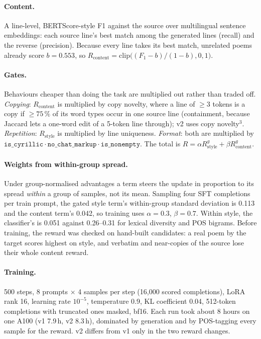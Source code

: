 \documentclass[11pt]{article}
\begin{document}
\paragraph{Content.} A line-level, BERTScore-style F1 against the source over
multilingual sentence embeddings: each source line's best match among the
generated lines (recall) and the reverse (precision). Because every line takes
its best match, unrelated poems already score $b=0.553$, so
$R_{\mathrm{content}}=\mathrm{clip}\big((F_1-b)/(1-b),0,1\big)$.

\paragraph{Gates.} Behaviours cheaper than doing the task are multiplied out
rather than traded off. \emph{Copying}: $R_{\mathrm{content}}$ is multiplied
by copy novelty, where a line of $\ge3$ tokens is a copy if $\ge75\,\%$ of its
word types occur in one source line (containment, because Jaccard lets a
one-word edit of a 5-token line through); v2 uses copy novelty$^3$.
\emph{Repetition}: $R_{\mathrm{style}}$ is multiplied by line uniqueness.
\emph{Format}: both are multiplied by
$\texttt{is\_cyrillic}\cdot\texttt{no\_chat\_markup}\cdot\texttt{is\_nonempty}$.
The total is $R=\alpha R^{g}_{\mathrm{style}}+\beta R^{g}_{\mathrm{content}}$.

\paragraph{Weights from within-group spread.} Under group-normalised
advantages a term steers the update in proportion to its spread \emph{within}
a group of samples, not its mean. Sampling four SFT completions per train
prompt, the gated style term's within-group standard deviation is 0.113 and
the content term's 0.042, so training uses $\alpha=0.3$, $\beta=0.7$. Within
style, the classifier's is 0.051 against 0.26--0.31 for lexical diversity and
POS bigrams. Before training, the reward was checked on hand-built candidates:
a real poem by the target scores highest on style, and verbatim and
near-copies of the source lose their whole content reward.

\paragraph{Training.} 500 steps, 8 prompts $\times$ 4 samples per step
(16{,}000 scored completions), LoRA rank 16, learning rate $10^{-5}$,
temperature 0.9, KL coefficient 0.04, 512-token completions with truncated
ones masked, bf16. Each run took about 8 hours on one A100 (v1 7.9\,h, v2
8.3\,h), dominated by generation and by POS-tagging every sample for the
reward. v2 differs from v1 only in the two reward changes.
\end{document}
